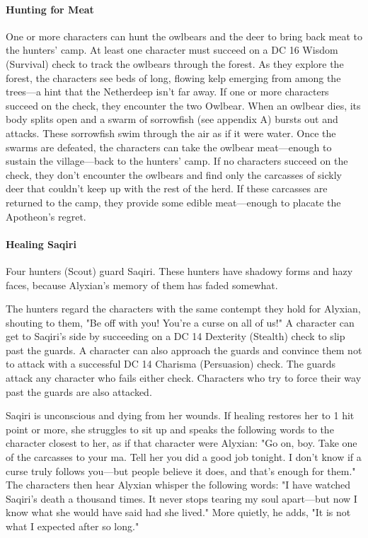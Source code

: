 \documentclass[10pt,a4paper,twoside,twocolumn,openany,nodeprecatedcode]{dndbook}
\begin{document}
\paragraph{Hunting for Meat}
One or more characters can hunt the owlbears and the deer to bring back meat to the hunters' camp. At least one character must succeed on a DC 16 Wisdom (Survival) check to track the owlbears through the forest. As they explore the forest, the characters see beds of long, flowing kelp emerging from among the trees—a hint that the Netherdeep isn't far away. If one or more characters succeed on the check, they encounter the two Owlbear. When an owlbear dies, its body splits open and a swarm of sorrowfish (see appendix A) bursts out and attacks. These sorrowfish swim through the air as if it were water. Once the swarms are defeated, the characters can take the owlbear meat—enough to sustain the village—back to the hunters' camp. If no characters succeed on the check, they don't encounter the owlbears and find only the carcasses of sickly deer that couldn't keep up with the rest of the herd. If these carcasses are returned to the camp, they provide some edible meat—enough to placate the Apotheon's regret.

\paragraph{Healing Saqiri}
Four hunters (Scout) guard Saqiri. These hunters have shadowy forms and hazy faces, because Alyxian's memory of them has faded somewhat.

The hunters regard the characters with the same contempt they hold for Alyxian, shouting to them, "Be off with you! You're a curse on all of us!" A character can get to Saqiri's side by succeeding on a DC 14 Dexterity (Stealth) check to slip past the guards. A character can also approach the guards and convince them not to attack with a successful DC 14 Charisma (Persuasion) check. The guards attack any character who fails either check. Characters who try to force their way past the guards are also attacked.

Saqiri is unconscious and dying from her wounds. If healing restores her to 1 hit point or more, she struggles to sit up and speaks the following words to the character closest to her, as if that character were Alyxian: "Go on, boy. Take one of the carcasses to your ma. Tell her you did a good job tonight. I don't know if a curse truly follows you—but people believe it does, and that's enough for them." The characters then hear Alyxian whisper the following words: "I have watched Saqiri's death a thousand times. It never stops tearing my soul apart—but now I know what she would have said had she lived." More quietly, he adds, "It is not what I expected after so long."
\end{document}
